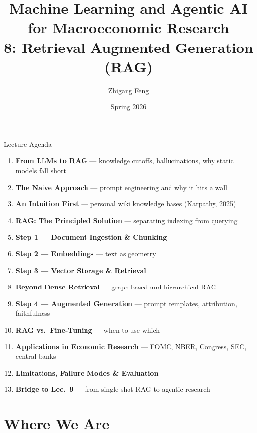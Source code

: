 \documentclass[10pt,english,aspectratio=169]{beamer}
\title[ML \& Agentic AI for Macro Research]{Machine Learning and Agentic AI for Macroeconomic Research\\
8: Retrieval Augmented Generation (RAG)\\[0.5em]}
\author{Zhigang Feng}
\date{Spring 2026}
\newcommand\makebeamertitle{\frame{\maketitle}}%
\begin{document}
\makebeamertitle


\begin{frame}{Lecture Agenda}
\begin{enumerate}
  \item \textbf{From LLMs to RAG} --- knowledge cutoffs, hallucinations, why static models fall short
  \medskip
  \item \textbf{The Naive Approach} --- prompt engineering and why it hits a wall
  \medskip
  \item \textbf{An Intuition First} --- personal wiki knowledge bases (Karpathy, 2025)
  \medskip
  \item \textbf{RAG: The Principled Solution} --- separating indexing from querying
  \medskip
  \item \textbf{Step 1 --- Document Ingestion \& Chunking}
  \medskip
  \item \textbf{Step 2 --- Embeddings} --- text as geometry
  \medskip
  \item \textbf{Step 3 --- Vector Storage \& Retrieval}
  \medskip
  \item \textbf{Beyond Dense Retrieval} --- graph-based and hierarchical RAG
  \medskip
  \item \textbf{Step 4 --- Augmented Generation} --- prompt templates, attribution, faithfulness
  \medskip
  \item \textbf{RAG vs.\ Fine-Tuning} --- when to use which
  \medskip
  \item \textbf{Applications in Economic Research} --- FOMC, NBER, Congress, SEC, central banks
  \medskip
  \item \textbf{Limitations, Failure Modes \& Evaluation}
  \medskip
  \item \textbf{Bridge to Lec.\ 9} --- from single-shot RAG to agentic research
\end{enumerate}
\end{frame}

\section{Where We Are}
\end{document}
